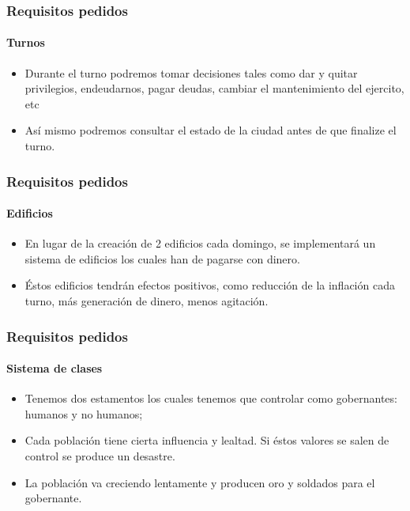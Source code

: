 \documentclass[12pt]{beamer}
\begin{document}
    \begin{frame}
        \frametitle{Requisitos pedidos}
        \framesubtitle{Turnos}
        \begin{itemize}
            \item Durante el turno podremos tomar decisiones tales como dar y quitar privilegios, endeudarnos, pagar deudas, cambiar el mantenimiento del ejercito, etc
            \item Así mismo podremos consultar el estado de la ciudad antes de que finalize el turno.
        \end{itemize}
        
    \end{frame}

    \begin{frame}
        \frametitle{Requisitos pedidos}
        \framesubtitle{Edificios}
        \begin{itemize}
            \item En lugar de la creación de 2 edificios cada domingo, se implementará un sistema de edificios los cuales han de pagarse con dinero.
            \item Éstos edificios tendrán efectos positivos, como reducción de la inflación cada turno, más generación de dinero, menos agitación.
        \end{itemize}
        
    \end{frame}
    
    \begin{frame}
        \frametitle{Requisitos pedidos}
        \framesubtitle{Sistema de clases}
        \begin{itemize}
            \item Tenemos dos estamentos los cuales tenemos que controlar como gobernantes: humanos y no humanos;
            \item Cada población tiene cierta influencia y lealtad. Si éstos valores se salen de control se produce un desastre. 
            \item La población va creciendo lentamente y producen oro y soldados para el gobernante. 
        \end{itemize}
        
    \end{frame}
\end{document}
